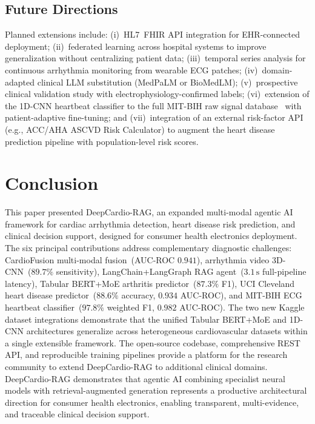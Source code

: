 \documentclass[journal,10pt,twoside]{IEEEtran}
\begin{document}
\subsection{Future Directions}

Planned extensions include:
(i)~HL7~FHIR API integration for EHR-connected deployment;
(ii)~federated learning across hospital systems to improve generalization without
centralizing patient data;
(iii)~temporal series analysis for continuous arrhythmia monitoring from wearable ECG
patches;
(iv)~domain-adapted clinical LLM substitution (MedPaLM or BioMedLM);
(v)~prospective clinical validation study with electrophysiology-confirmed labels;
(vi)~extension of the 1D-CNN heartbeat classifier to the full MIT-BIH raw signal
database~\cite{moody2001} with patient-adaptive fine-tuning; and
(vii)~integration of an external risk-factor API (e.g., ACC/AHA ASCVD Risk Calculator)
to augment the heart disease prediction pipeline with population-level risk scores.

\section{Conclusion}
\label{sec:conclusion}

This paper presented DeepCardio-RAG, an expanded multi-modal agentic AI framework
for cardiac arrhythmia detection, heart disease risk prediction, and clinical decision
support, designed for consumer health electronics deployment.
The six principal contributions address complementary diagnostic challenges:
CardioFusion multi-modal fusion~(AUC-ROC $0.941$),
arrhythmia video 3D-CNN~($89.7\%$ sensitivity),
LangChain+LangGraph RAG agent~($3.1\,\text{s}$ full-pipeline latency),
Tabular BERT+MoE arthritis predictor~($87.3\%$ F1),
UCI Cleveland heart disease predictor~($88.6\%$ accuracy, $0.934$ AUC-ROC), and
MIT-BIH ECG heartbeat classifier~($97.8\%$ weighted F1, $0.982$ AUC-ROC).
The two new Kaggle dataset integrations demonstrate that the unified Tabular BERT+MoE
and 1D-CNN architectures generalize across heterogeneous cardiovascular datasets
within a single extensible framework.
The open-source codebase, comprehensive REST API, and reproducible training
pipelines provide a platform for the research community to extend DeepCardio-RAG
to additional clinical domains.
DeepCardio-RAG demonstrates that agentic AI combining specialist neural models with
retrieval-augmented generation represents a productive architectural direction for
consumer health electronics, enabling transparent, multi-evidence, and traceable
clinical decision support.
\end{document}
